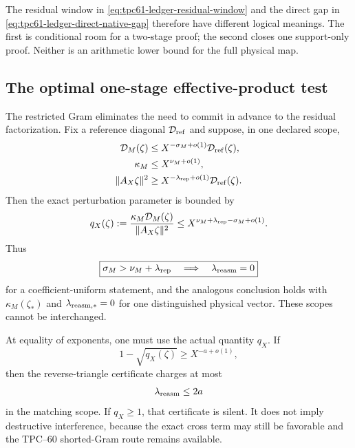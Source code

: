 The residual window in \eqref{eq:tpc61-ledger-residual-window} and the direct
gap in \eqref{eq:tpc61-ledger-direct-native-gap} therefore have different
logical meanings.  The first is conditional room for a two-stage proof; the
second closes one support-only proof.  Neither is an arithmetic lower bound
for the full physical map.

\subsection{The optimal one-stage effective-product test}

The restricted Gram eliminates the need to commit in advance to the
residual factorization.  Fix a reference diagonal \(\mathcal D_{\rm ref}\) and
suppose, in one declared scope,
\begin{align}
 \mathcal D_M(\zeta)
 &\le X^{-\sigma_M+o(1)}\mathcal D_{\rm ref}(\zeta),
 \label{eq:tpc61-ledger-missing-input}\\
 \kappa_M
 &\le X^{\nu_M+o(1)},
 \label{eq:tpc61-ledger-kappa-input}\\
 \|A_X\zeta\|^2
 &\ge X^{-\lambda_{\rm rep}+o(1)}
        \mathcal D_{\rm ref}(\zeta).
 \label{eq:tpc61-ledger-reference-input}
\end{align}
Then the exact perturbation parameter is bounded by
\begin{equation}
 q_X(\zeta)
 :=\frac{\kappa_M\mathcal D_M(\zeta)}{\|A_X\zeta\|^2}
 \le X^{\nu_M+\lambda_{\rm rep}-\sigma_M+o(1)}.
 \label{eq:tpc61-ledger-q-bound}
\end{equation}
Thus
\begin{equation}
 \boxed{
 \sigma_M>\nu_M+\lambda_{\rm rep}
 \quad\Longrightarrow\quad
 \lambda_{\rm reasm}=0}
 \label{eq:tpc61-ledger-zero-cost-test}
\end{equation}
for a coefficient-uniform statement, and the analogous conclusion holds
with \(\kappa_M(\zeta_*)\) and \(\lambda_{\rm reasm,*}=0\) for one
distinguished physical vector.  These scopes cannot be interchanged.

At equality of exponents, one must use the actual quantity \(q_X\).  If
\begin{equation}
 1-\sqrt{q_X(\zeta)}\ge X^{-a+o(1)},
 \label{eq:tpc61-ledger-critical-margin}
\end{equation}
then the reverse-triangle certificate charges at most
\begin{equation}
 \lambda_{\rm reasm}\le2a
 \label{eq:tpc61-ledger-critical-cost}
\end{equation}
in the matching scope.  If \(q_X\ge1\), that certificate is silent.  It
does not imply destructive interference, because the exact cross term may
still be favorable and the TPC--60 shorted-Gram route remains available.

